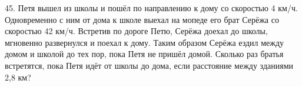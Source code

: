 45. Петя вышел из школы и пошёл по направлению к дому со скоростью 4 км/ч. Одновременно с ним от дома к школе выехал на мопеде его брат Серёжа со скоростью 42 км/ч. Встретив по дороге Петю, Серёжа доехал до школы, мгновенно развернулся и поехал к дому. Таким образом Серёжа ездил между домом и школой до тех пор, пока Петя не пришёл домой. Сколько раз братья встретятся, пока Петя идёт от школы до дома, если расстояние между зданиями 2,8 км?\\
